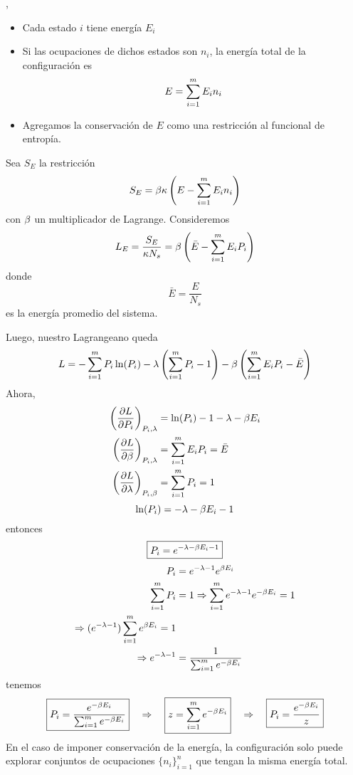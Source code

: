 ,
\begin{itemize}
	\item Cada estado $i$ tiene energía $E_i$
	\item Si las ocupaciones de dichos estados son $n_i$, la energía total de la configuración es
	\begin{equation}
  E=\sum_{i=1}^m E_in_i
\end{equation}
\item Agregamos la conservación de $E$ como una restricción al funcional de entropía.
\end{itemize}

Sea $S_E$ la restricción
\begin{equation}
  S_E=\beta \kappa \left(E-\sum_{i=1}^m E_in_i\right)
\end{equation}
con $\beta$ un multiplicador de Lagrange. Consideremos
\begin{equation}
  L_E=\frac{S_E}{\kappa N_s}=\beta \left(\bar{E}-\sum_{i=1}^m E_iP_i\right)
\end{equation}
donde 
\begin{equation}
  \bar{E}=\frac{E}{N_s}
\end{equation}
es la energía promedio del sistema.

Luego, nuestro Lagrangeano queda
\begin{equation}
  L=-\sum_{i=1}^m P_i\ln(P_i)-\lambda \left(\sum_{i=1}^m P_i-1\right)-\beta \left(\sum_{i=1}^m E_iP_i-\bar{E}\right)
\end{equation}
Ahora,
\begin{align}
  \left(\pdv{L}{P_i}\right)_{P_i,\lambda}&=\ln(P_i)-1-\lambda-\beta E_i\\
  \left(\pdv{L}{\beta}\right)_{P_i,\lambda}&=\sum_{i=1}^m E_iP_i=\bar{E}\\
  \left(\pdv{L}{\lambda}\right)_{P_i,\beta}&=\sum_{i=1}^m P_i=1
\end{align}
\begin{equation}
  \ln(P_i)=-\lambda-\beta E_i-1
\end{equation}
entonces
\begin{equation}
\boxed{  P_i=e^{-\lambda-\beta E_i-1}}
\end{equation}
\begin{align}
  P_i&=e^{-\lambda-1}e^{\beta E_i}\\
  \sum_{i=1}^m P_i&=1\Rightarrow \sum_{i=1}^m e^{-\lambda-1}e^{-\beta E_i}=1\\
  \Rightarrow (e^{-\lambda-1})\sum_{i=1}^m e^{\beta E_i}=1\\
  \Rightarrow e^{-\lambda-1}&=\frac{1}{\sum_{i=1}^m e^{-\beta E_i}}
\end{align}
tenemos
\begin{equation}
  \boxed{P_i=\frac{e^{-\beta E_i}}{\sum_{i=1}^m e^{-\beta E_i}}}\quad \Rightarrow\quad \boxed{z=\sum_{i=1}^m e^{-\beta E_i}}\quad \Rightarrow\quad \boxed{P_i=\frac{e^{-\beta E_i}}{z}}
\end{equation}
En el caso de imponer conservación de la energía, la configuración solo puede explorar conjuntos de ocupaciones $\{n_i\}_{i=1}^n$ que tengan la misma energía total.

